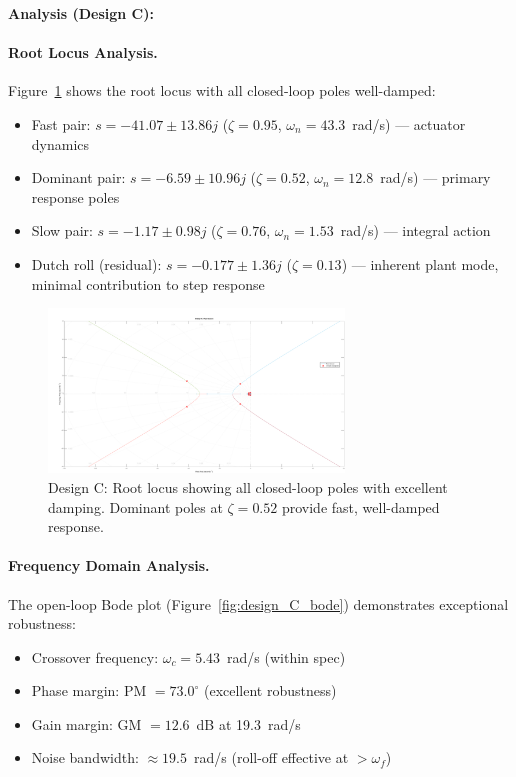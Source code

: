 \textbf{Analysis (Design C):}

\paragraph{Root Locus Analysis.}
Figure~\ref{fig:design_C_rlocus} shows the root locus with all closed-loop poles well-damped:
\begin{itemize}
    \item Fast pair: $s = -41.07 \pm 13.86j$ ($\zeta=0.95$, $\omega_n=43.3$~rad/s) --- actuator dynamics
    \item Dominant pair: $s = -6.59 \pm 10.96j$ ($\zeta=0.52$, $\omega_n=12.8$~rad/s) --- primary response poles
    \item Slow pair: $s = -1.17 \pm 0.98j$ ($\zeta=0.76$, $\omega_n=1.53$~rad/s) --- integral action
    \item Dutch roll (residual): $s = -0.177 \pm 1.36j$ ($\zeta=0.13$) --- inherent plant mode, minimal contribution to step response
\end{itemize}

\begin{figure}[h!]
\centering
\includegraphics[width=0.7\textwidth]{../MATLAB/LaTeX_Exports/design_C_root_locus.pdf}
\caption{Design C: Root locus showing all closed-loop poles with excellent damping. Dominant poles at $\zeta=0.52$ provide fast, well-damped response.}
\label{fig:design_C_rlocus}
\end{figure}

\paragraph{Frequency Domain Analysis.}
The open-loop Bode plot (Figure~\ref{fig:design_C_bode}) demonstrates exceptional robustness:
\begin{itemize}
    \item Crossover frequency: $\omega_c = 5.43$~rad/s (within spec)
    \item Phase margin: PM $= 73.0^\circ$ (excellent robustness)
    \item Gain margin: GM $= 12.6$~dB at 19.3~rad/s
    \item Noise bandwidth: $\approx 19.5$~rad/s (roll-off effective at $>\omega_f$)
\end{itemize}

